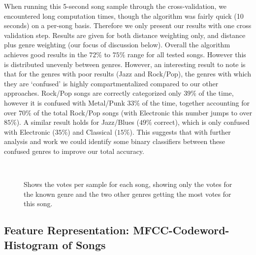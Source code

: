 \documentclass[10pt]{article}
\begin{document}
When running this 5-second song sample through the cross-validation, we encountered long computation times, though the algorithm was fairly quick (10 seconds) on a per-song basis.  Therefore we only present our results with one cross validation step.  Results are given for both distance weighting only, and distance plus genre weighting (our focus of discussion below).  Overall the algorithm achieves good results in the $72\%$ to $75\%$ range for all tested songs.  However this is distributed unevenly between genres.  However, an interesting result to note is that for the genres with poor results (Jazz and Rock/Pop), the genres with which they are ‘confused’ is highly compartmentalized compared to our other approaches.  Rock/Pop songs are correctly categorized only $39\%$ of the time, however it is confused with Metal/Punk $33\%$ of the time, together accounting for over $70\%$ of the total Rock/Pop songs (with Electronic this number jumps to over $85\%$).  A similar result holds for Jazz/Blues ($49\%$ correct), which is only confused with Electronic ($35\%$) and Classical ($15\%$).  This suggests that with further analysis and work we could identify some binary classifiers between these confused genres to improve our total accuracy.


\begin{figure}[h!]
\\
\caption{Shows the votes per sample for each song, showing only the votes for the known genre and the two other genres getting the most votes for this song.}
\label{fig:fivesecond_song_votes}
\end{figure}

\subsection{ Feature Representation: MFCC-Codeword-Histogram of Songs }
\end{document}
